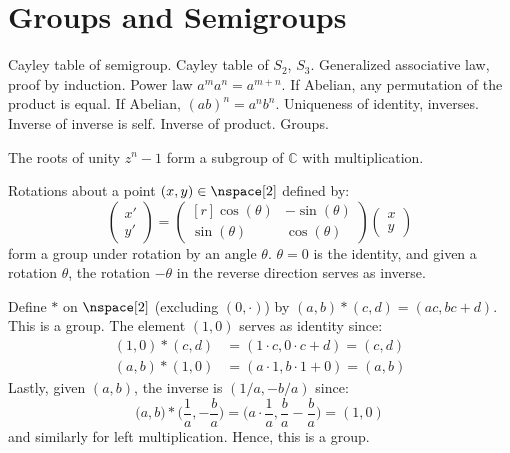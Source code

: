 \documentclass{book}                                                           %
\begin{document}
    \section{Groups and Semigroups}
        Cayley table of semigroup. Cayley table of $S_{2}$, $S_{3}$.
        Generalized associative law, proof by induction. Power law
        $a^{m}a^{n}=a^{m+n}$. If Abelian, any permutation of the product is
        equal. If Abelian, $(ab)^{n}=a^{n}b^{n}$. Uniqueness of identity,
        inverses. Inverse of inverse is self. Inverse of product. Groups.
        \begin{example}
            The roots of unity $z^{n}-1$ form a subgroup of $\mathbb{C}$
            with multiplication.
        \end{example}
        \begin{example}
            Rotations about a point $(x,y)\in\nspace[2]$ defined by:
            \begin{equation}
                \begin{pmatrix}
                    x'\\
                    y'
                \end{pmatrix}=
                \begin{pmatrix*}[r]
                    \cos(\theta)&\minus\sin(\theta)\\
                    \sin(\theta)&\cos(\theta)
                \end{pmatrix*}
                \begin{pmatrix}
                    x\\
                    y
                \end{pmatrix}
            \end{equation}
            form a group under rotation by an angle $\theta$. $\theta=0$ is
            the identity, and given a rotation $\theta$, the rotation
            $\minus\theta$ in the reverse direction serves as inverse.
        \end{example}
        \begin{example}
            Define $*$ on $\nspace[2]$ (excluding $(0,\cdot)$) by
            $(a,b)*(c,d)=(ac,bc+d)$. This is a group. The element $(1,0)$
            serves as identity since:
            \begin{align}
                (1,0)*(c,d)&=(1\cdot{c},0\cdot{c}+d)=(c,d)\\
                (a,b)*(1,0)&=(a\cdot{1},b\cdot{1}+0)=(a,b)
            \end{align}
            Lastly, given $(a,b)$, the inverse is $(1/a,\minus{b}/a)$ since:
            \begin{equation}
                \big(a,b\big)*\big(\frac{1}{a},\minus\frac{b}{a}\big)
                    =\big(a\cdot\frac{1}{a},\frac{b}{a}-\frac{b}{a}\big)
                    =(1,0)
            \end{equation}
            and similarly for left multiplication. Hence, this is a group.
        \end{example}
\end{document}
